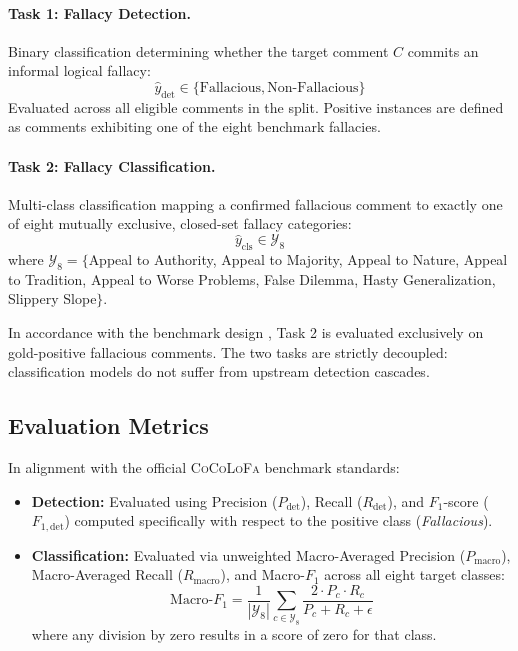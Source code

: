 \documentclass[11pt]{article}
\begin{document}
\paragraph{Task 1: Fallacy Detection.}
Binary classification determining whether the target comment $C$ commits an informal logical fallacy:
\begin{equation}
    \hat{y}_{\text{det}} \in \{\text{Fallacious}, \text{Non-Fallacious}\}
\end{equation}
Evaluated across all eligible comments in the split. Positive instances are defined as comments exhibiting one of the eight benchmark fallacies.

\paragraph{Task 2: Fallacy Classification.}
Multi-class classification mapping a confirmed fallacious comment to exactly one of eight mutually exclusive, closed-set fallacy categories:
\begin{equation}
    \hat{y}_{\text{cls}} \in \mathcal{Y}_{\text{8}}
\end{equation}
where $\mathcal{Y}_{\text{8}} = \{$Appeal to Authority, Appeal to Majority, Appeal to Nature, Appeal to Tradition, Appeal to Worse Problems, False Dilemma, Hasty Generalization, Slippery Slope$\}$. 

In accordance with the benchmark design \cite{cocolofa2024}, Task 2 is evaluated exclusively on gold-positive fallacious comments. The two tasks are strictly decoupled: classification models do not suffer from upstream detection cascades.

\subsection{Evaluation Metrics}
In alignment with the official \textsc{CoCoLoFa} benchmark standards:
\begin{itemize}[leftmargin=*,itemsep=1pt,topsep=2pt]
    \item \textbf{Detection:} Evaluated using Precision ($P_{\text{det}}$), Recall ($R_{\text{det}}$), and $F_1$-score ($F_{1,\text{det}}$) computed specifically with respect to the positive class (\textit{Fallacious}).
    \item \textbf{Classification:} Evaluated via unweighted Macro-Averaged Precision ($P_{\text{macro}}$), Macro-Averaged Recall ($R_{\text{macro}}$), and Macro-$F_1$ across all eight target classes:
    \begin{equation}
        \text{Macro-}F_1 = \frac{1}{|\mathcal{Y}_{\text{8}}|} \sum_{c \in \mathcal{Y}_{\text{8}}} \frac{2 \cdot P_c \cdot R_c}{P_c + R_c + \epsilon}
    \end{equation}
    where any division by zero results in a score of zero for that class.
\end{itemize}
\end{document}
